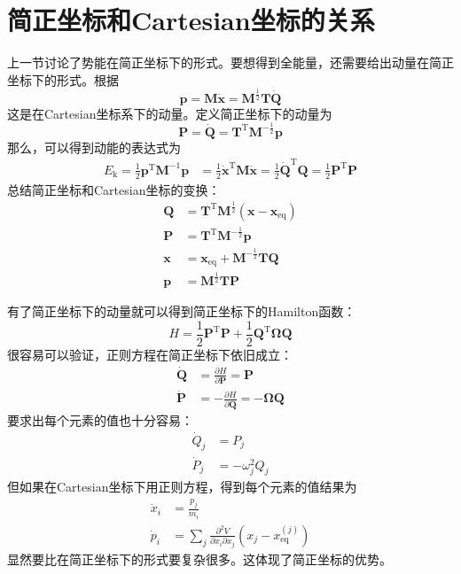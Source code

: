    \section{简正坐标和Cartesian坐标的关系}
    上一节讨论了势能在简正坐标下的形式。要想得到全能量，还需要给出动量在简正坐标下的形式。根据
    \begin{equation*}
        \bm{p} = \bm{M\dot{x}} = \bm{M}^{\frac 12} \bm{T\dot{Q}}
    \end{equation*}
    这是在Cartesian坐标系下的动量。定义简正坐标下的动量为
    \begin{equation*}
        \bm{P = \dot{Q}} = \bm{T}^\mathrm{T} \bm{M}^{-\frac 12} \bm{p}
    \end{equation*}
    那么，可以得到动能的表达式为
    \begin{align*}
        E_\mathrm{k} = \frac 12 \bm{p}^{\mathrm{T}} \bm{M}^{-1} \bm{p} &= \frac 12 \bm{\dot{x}}^\mathrm{T}\bm{M\dot{x}}
        = \frac 12 \bm{\dot{Q}}^\mathrm{T} \bm{Q}
        = \frac 12 \bm{P}^{\mathrm{T}} \bm{P}
    \end{align*}
    总结简正坐标和Cartesian坐标的变换：
    \begin{align*}
        \bm{Q} &= \bm{T}^\mathrm{T} \bm{M}^{\frac 12} (\bm{x-x}_\mathrm{eq})\\
        \bm{P} &= \bm{T}^\mathrm{T} \bm{M}^{-\frac 12} \bm{p}\\
        \bm{x} &= \bm{x}_\mathrm{eq} + \bm{M}^{-\frac 12}\bm{TQ}\\
        \bm{p} &= \bm{M}^{\frac 12}\bm{TP}
    \end{align*}

    有了简正坐标下的动量就可以得到简正坐标下的Hamilton函数：
    \begin{equation*}
        H = \frac 12 \bm{P}^\mathrm{T}\bm{P} + \frac 12 \bm{Q}^\mathrm{T} \bm{\Omega Q}
    \end{equation*}
    很容易可以验证，正则方程在简正坐标下依旧成立：
    \begin{align*}
        \bm{\dot{Q}} &= \frac {\partial H}{\partial \bm{P}} = \bm{P}\\
        \bm{\dot{P}} &= -\frac {\partial H}{\partial \bm{Q}} = -\bm{\Omega Q}
    \end{align*}
    要求出每个元素的值也十分容易：
    \begin{align*}
        \dot{Q}_j &= P_j\\
        \dot{P}_j &= - \omega_j^2 Q_j
    \end{align*}
    但如果在Cartesian坐标下用正则方程，得到每个元素的值结果为
    \begin{align*}
        \dot{x}_i &= \frac {p_j}{m_i}\\
        \dot{p}_i &= \sum_j \frac {\partial^2 V}{\partial x_i \partial x_j} (x_j - x_\mathrm{eq}^{(j)})
    \end{align*}
    显然要比在简正坐标下的形式要复杂很多。这体现了简正坐标的优势。

